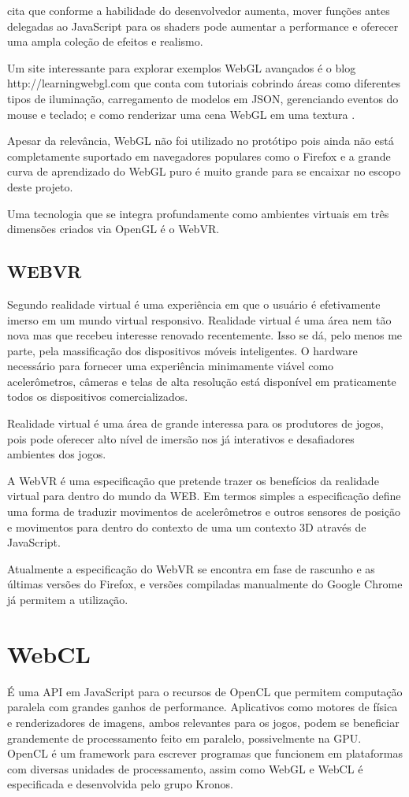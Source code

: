\begin{draft}
\cite{html5mostwanted} cita que conforme a habilidade do desenvolvedor
aumenta, mover funções antes delegadas ao JavaScript para os shaders
pode aumentar a performance e oferecer uma ampla coleção de efeitos e
realismo.

Um site interessante para explorar exemplos WebGL avançados é o blog
http://learningwebgl.com que conta com tutoriais cobrindo áreas como
diferentes tipos de iluminação, carregamento de modelos em JSON,
gerenciando eventos do mouse e teclado; e como renderizar uma cena WebGL
em uma textura \autocite[pp.42]{3daps}.

Apesar da relevância, WebGL não foi utilizado no protótipo pois
ainda não está completamente suportado em navegadores populares como
o Firefox e a grande curva de aprendizado do WebGL puro é muito grande
para se encaixar no escopo deste projeto.

Uma tecnologia que se integra profundamente como ambientes virtuais
em três dimensões criados via OpenGL é o WebVR.
\end{draft}
\subsection{WEBVR}
Segundo \cite{virtualReality} realidade virtual é uma experiência em
que o usuário é efetivamente imerso em um mundo virtual responsivo.
Realidade virtual é uma área nem tão nova mas que recebeu interesse
renovado recentemente. Isso se dá, pelo menos me parte, pela
massificação dos dispositivos móveis inteligentes. O hardware
necessário para fornecer uma experiência minimamente viável como
acelerômetros, câmeras e telas de alta resolução está disponível
em praticamente todos os dispositivos comercializados.

Realidade virtual é uma área de grande interessa para os produtores
de jogos, pois pode oferecer alto nível de imersão nos já
interativos e desafiadores ambientes dos jogos.

A WebVR é uma especificação que pretende trazer os benefícios
da realidade virtual para dentro do mundo da WEB. Em termos simples
a especificação define uma forma de traduzir movimentos de
acelerômetros e outros sensores de posição e movimentos para dentro
do contexto de uma um contexto 3D através de JavaScript.

Atualmente a especificação do WebVR se encontra em fase de rascunho e
as últimas versões do Firefox, e versões compiladas manualmente do
Google Chrome já permitem a utilização.
\section{WebCL}
É uma API em JavaScript para o recursos de OpenCL que permitem
computação paralela com grandes ganhos de performance. Aplicativos
como motores de física e renderizadores de imagens, ambos relevantes
para os jogos, podem se beneficiar grandemente de processamento feito em
paralelo, possivelmente na GPU. OpenCL é um framework para escrever
programas que funcionem em plataformas com diversas unidades de
processamento, assim como WebGL e WebCL é especificada e desenvolvida
pelo grupo Kronos.

